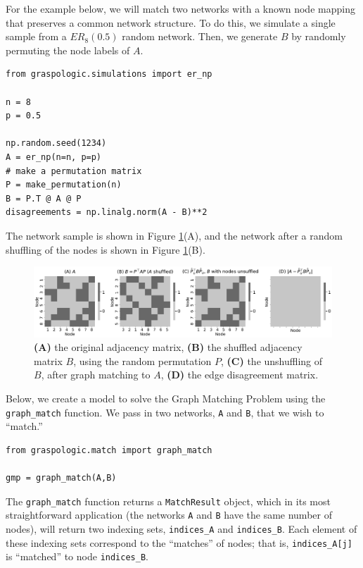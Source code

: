 For the example below, we will match two networks with a known node mapping that preserves a common network structure. To do this, we simulate a single sample from a $ER_8(0.5)$ random network. Then, we generate $B$ by randomly permuting the node labels of $A$. 

\begin{lstlisting}[style=python]
from graspologic.simulations import er_np

n = 8
p = 0.5

np.random.seed(1234)
A = er_np(n=n, p=p)
# make a permutation matrix
P = make_permutation(n)
B = P.T @ A @ P
disagreements = np.linalg.norm(A - B)**2
\end{lstlisting}

The network sample is shown in Figure \ref{fig:ch8:gm:simp_ex}(A), and the network after a random shuffling of the nodes is shown in Figure \ref{fig:ch8:gm:simp_ex}(B). 

\begin{figure}
    \centering
    \includegraphics[width=\linewidth]{applications/ch8/Images/gm_simp_ex.png}
    \caption[Unshuffling to solve the graph matching problem]{\textbf{(A)} the original adjacency matrix, \textbf{(B)} the shuffled adjacency matrix $B$, using the random permutation $P$, \textbf{(C)} the unshuffling of $B$, after graph matching to $A$, \textbf{(D)} the edge disagreement matrix.}
    \label{fig:ch8:gm:simp_ex}
\end{figure}

Below, we create a model to solve the Graph Matching Problem using the \texttt{graph\_match} function. We pass in two networks, \texttt{A} and \texttt{B}, that we wish to ``match.''

\begin{lstlisting}[style=python]
from graspologic.match import graph_match

gmp = graph_match(A,B)
\end{lstlisting}

The \texttt{graph\_match} function returns a \texttt{MatchResult} object, which in its most straightforward application (the networks \texttt{A} and \texttt{B} have the same number of nodes), will return two indexing sets, \texttt{indices\_A} and \texttt{indices\_B}. Each element of these indexing sets correspond to the ``matches'' of nodes; that is, \texttt{indices\_A[j]} is ``matched'' to node \texttt{indices\_B}.

